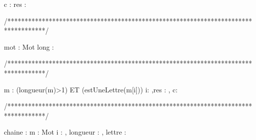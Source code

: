 \begin{algorithme}
      {c : \caractere}%
      {\booleen}%
      {res : \booleen}%
      {
           {}
           {}
            
      }
\end{algorithme}

/***********************************************************************************/
\begin{algorithme}
       {mot : Mot}%
       {\entier}%
       {long : \entier }%
       {
           {
           }
           
         
        }
\end{algorithme}

/***********************************************************************************/
\begin{algorithme}
     {m : \chaine}%
     {\booleen}%
     {(longueur(m)>1) ET (estUneLettre(m[i]))}%
     {i: \entier,res : \booleen, c: \caractere}%
     {
        	{
        	}%
        	{
			   {
				  {
				  }%
				  {
				  }%
		           }%
                }%
        
      }
  
\end{algorithme}

/***********************************************************************************/
\begin{algorithme}
     {chaine : \chaine}%
     {m : Mot}%
     {i : \entier, longueur : \entier, lettre : \caractere }%
     {
	  {
	  }
     }
\end{algorithme}

